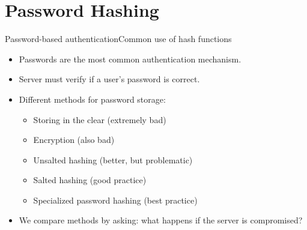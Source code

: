 \documentclass[aspectratio=169, lualatex, handout]{beamer}
\begin{document}
\section{Password Hashing}

\begin{frame}{Password-based authentication}{Common use of hash functions}
	\begin{itemize}[<+->]
		\item Passwords are the most common authentication mechanism.
		\item Server must verify if a user's password is correct.
		\item Different methods for password storage:
		      \begin{itemize}[<+->]
			      \item Storing in the clear (extremely bad)
			      \item Encryption (also bad)
			      \item Unsalted hashing (better, but problematic)
			      \item Salted hashing (good practice)
			      \item Specialized password hashing (best practice)
		      \end{itemize}
		\item We compare methods by asking: what happens if the server is compromised?
	\end{itemize}
\end{frame}
\end{document}
